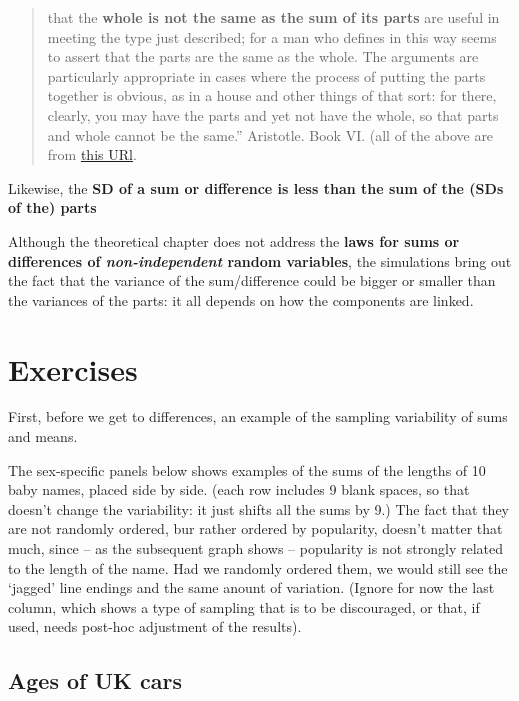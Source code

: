 \documentclass[]{book}
\begin{document}
\begin{quote}
that the \textbf{whole is not the same as the sum of its parts} are useful in meeting the type just described; for a man who defines in this way seems to assert that the parts are the same as the whole. The arguments are particularly appropriate in cases where the process of putting the parts together is obvious, as in a house and other things of that sort: for there, clearly, you may have the parts and yet not have the whole, so that parts and whole cannot be the same.'' Aristotle. Book VI. (all of the above are from \href{http://se-scholar.com/se-blog/2017/6/23/who-said-the-whole-is-greater-than-the-sum-of-the-parts}{this URl}.
\end{quote}

Likewise, the \textbf{SD of a sum or difference is less than the sum of the (SDs of the) parts}

Although the theoretical chapter does not address the \textbf{laws for sums or differences of \emph{non-independent} random variables}, the simulations bring out the fact that the variance of the sum/difference could be bigger or smaller than the variances of the parts: it all depends on how the components are linked.

\hypertarget{exercises-8}{%
\section{Exercises}\label{exercises-8}}

First, before we get to differences, an example of the sampling variability of sums and means.

The sex-specific panels below shows examples of the sums of the lengths of 10 baby names, placed side by side. (each row includes 9 blank spaces, so that doesn't change the variability: it just shifts all the sums by 9.) The fact that they are not randomly ordered, bur rather ordered by popularity, doesn't matter that much, since -- as the subsequent graph shows -- popularity is not strongly related to the length of the name. Had we randomly ordered them, we would still see the `jagged' line endings and the same anount of variation. (Ignore for now the last column, which shows a type of sampling that is to be discouraged, or that, if used, needs post-hoc adjustment of the results).

\hypertarget{ages-of-uk-cars}{%
\subsection{Ages of UK cars}\label{ages-of-uk-cars}}
\end{document}
